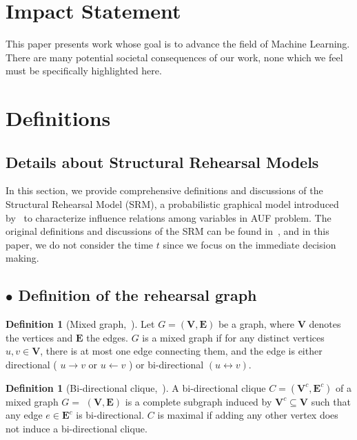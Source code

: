 \documentclass{article}
\theoremstyle{plain}
\theoremstyle{definition}
\newtheorem{definition}[theorem]{Definition}
\def \V {\mathbf{V}}
\def \E {\mathbf{E}}
\def \V {\mathbf{V}}
\def \V {\mathbf{V}}
\begin{document}
\section*{Impact Statement}
This paper presents work whose goal is to advance the field of 
Machine Learning. There are many potential societal consequences 
of our work, none which we feel must be specifically highlighted here. 

\nocite{langley00}





\newpage
\appendix
\onecolumn

\section{Definitions}
\subsection{Details about Structural Rehearsal Models}
\label{app:SRM}


In this section, we provide comprehensive definitions and discussions of the Structural Rehearsal Model (SRM), a probabilistic graphical model introduced by~\cite{qint2023srm} to characterize influence relations among variables in AUF problem. 
The original definitions and discussions of the SRM can be found in~\citet{qint2023srm}, and in this paper, we do not consider the time $t$ since we focus on the immediate decision making.

\subsection*{$\bullet$ Definition of the rehearsal graph}


\begin{definition}[Mixed graph,~\cite{qint2023srm}]
  \label{def:mixed_graph} Let $G=(\V, \E)$ be a graph, where $\V$ denotes the vertices and $\E$ the edges. $G$ is a mixed graph if for any distinct vertices $u, v \in \V$, there is at most one edge connecting them, and the edge is either directional ( $u \rightarrow v$ or $u \leftarrow v$ ) or bi-directional $(u \leftrightarrow v)$.
\end{definition}

\begin{definition}[Bi-directional clique,~\cite{qint2023srm}]
  \label{def:bi_clique}
  A bi-directional clique $C=\left(\V^c, \E^c\right)$ of a mixed graph $G=$ $(\V, \E)$ is a complete subgraph induced by $\V^c \subseteq \V$ such that any edge $e \in \E^c$ is bi-directional. $C$ is maximal if adding any other vertex does not induce a bi-directional clique.
\end{definition}
\end{document}
